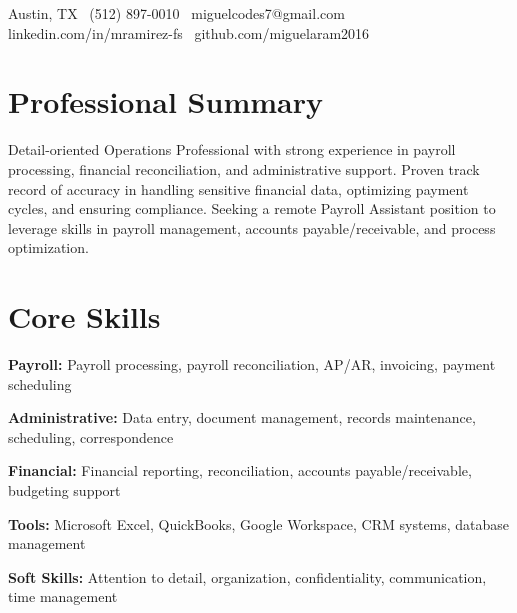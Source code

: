 \documentclass[letterpaper,10pt]{article}
\begin{document}
\vspace{15pt}
 \vspace{8pt}
\begin{flushleft}
  Austin, TX \textbar\ (512) 897-0010 \textbar\ miguelcodes7@gmail.com \\
  linkedin.com/in/mramirez-fs \textbar\ github.com/miguelaram2016
\end{flushleft}
\vspace{6pt}

\section*{Professional Summary}
\begin{compactitem}
  \item[]
    Detail-oriented Operations Professional with strong experience in payroll processing, financial reconciliation, and administrative support. Proven track record of accuracy in handling sensitive financial data, optimizing payment cycles, and ensuring compliance. Seeking a remote Payroll Assistant position to leverage skills in payroll management, accounts payable/receivable, and process optimization.
\end{compactitem}

\section*{Core Skills}
\begin{compactitem}
  \item[]
    \textbf{Payroll:} Payroll processing, payroll reconciliation, AP/AR, invoicing, payment scheduling
    \item[]
    \textbf{Administrative:} Data entry, document management, records maintenance, scheduling, correspondence
    \item[]
    \textbf{Financial:} Financial reporting, reconciliation, accounts payable/receivable, budgeting support
    \item[]
    \textbf{Tools:} Microsoft Excel, QuickBooks, Google Workspace, CRM systems, database management
    \item[]
    \textbf{Soft Skills:} Attention to detail, organization, confidentiality, communication, time management
\end{compactitem}

\end{document}
